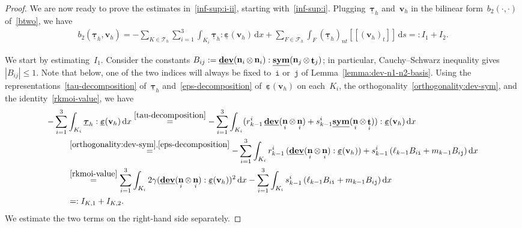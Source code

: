 \documentclass[10pt,a4paper]{amsart}
\newcommand{\F}{F}
\newcommand{\Fcalh}{\mathcal{F}_h}
\newcommand{\IKone}{I_{\K,1}}
\newcommand{\IKtwo}{I_{\K,2}}
\newcommand{\Ione}{I_1}
\newcommand{\Itwo}{I_2}
\newcommand{\K}{K}
\newcommand{\Ki}{{\K_i}}
\newcommand{\Tauh}{\mathcal{T}_h}
\newcommand{\btwo}{b_2}
\DeclareMathOperator{\dev}{\underline{\mathbf{dev}}}
\newcommand{\ds}{\, \mathrm{d}s}
\newcommand{\dx}{\, \mathrm{d}x}
\newcommand{\epsbfun}{\underline{\boldsymbol{\varepsilon}}}
\newcommand{\itt}{\mathtt{i}}
\newcommand{\jtt}{\mathtt{j}}
\newcommand{\jump}[1]{\left[\!\left[#1\right]\!\right]}
\newcommand{\lkmo}{\ell_{k-1}}
\newcommand{\mkmo}{m_{k-1}}
\DeclareMathOperator{\norm}{\bf{n}}
\newcommand{\normi}{\norm_i}
\newcommand{\normj}{\norm_j}
\newcommand{\normtang}{{nt}}
\newcommand{\rkmoi}{r_{k-1}^i}
\newcommand{\skmoi}{s_{k-1}^i}
\newcommand{\sym}{\underline{\bf{sym}}}
\DeclareMathOperator{\tang}{\bf{t}}
\newcommand{\tangi}{\tang_i}
\newcommand{\tangj}{\tang_j}
\newcommand{\tangscalar}{t}
\newcommand{\taubfh}{\underline{\boldsymbol{\tau}}_h}
\newcommand{\vbfh}{\mathbf{v}_h}
\begin{document}
\begin{proof}
We are now ready to prove the estimates in~\eqref{inf-sup:i-ii},
starting with~\eqref{inf-sup:i}.
Plugging~$\taubfh$ and~$\vbfh$
in the bilinear form~$\btwo(\cdot,\cdot)$ of~\eqref{btwo},
we have
\begin{equation*} \label{bt-Ione-Itwo}
\begin{split}
\btwo(\taubfh,\vbfh) 
= -\sum_{\K \in \Tauh} \sum_{i=1}^3 \int_{\Ki} \taubfh : \epsbfun(\vbfh) \dx
    + \sum_{\F \in \Fcalh} \int_{\F} (\taubfh)_{\normtang}\jump{(\vbfh)_{\tangscalar}} \ds 
=: \Ione + \Itwo.
\end{split}
\end{equation*}

We start by estimating~$\Ione$.
Consider the constants
$B_{ij} := \dev(\normi\otimes\normi):\sym(\normj\otimes\tangj)$;
in particular,
Cauchy--Schwarz inequality gives~$|B_{ij}| \leq 1$.
Note that below,
one of the two indices will always be fixed to~$\itt$ or~$\jtt$
of Lemma~\ref{lemma:dev-n1-n2-basis}.
Using the representations~\eqref{tau-decomposition} of~$\taubfh$
and~\eqref{eps-decomposition} of~$\epsbfun(\vbfh)$  on each~$\Ki$,
the orthogonality~\eqref{orthogonality:dev-sym},
and the identity~\eqref{rkmoi-value},
we have
\begin{equation} \label{Ione}
\begin{split}
-\sum_{i=1}^3& \int_{\Ki} \taubfh : \epsbfun(\vbfh) \dx 
\overset{\eqref{tau-decomposition}}{=}
-\sum_{i=1}^3 \int_{\Ki} (\rkmoi\dev(\normi\otimes\normi)+\skmoi\sym(\normi\otimes\tangi)) : \epsbfun(\vbfh) \dx \\
&\overset{\eqref{orthogonality:dev-sym},\eqref{eps-decomposition}}{=} 
-\sum_{i=1}^3 \int_{\Ki} 
   \rkmoi\,(\dev(\normi\otimes\normi):\epsbfun(\vbfh))
   + \skmoi\,(\lkmo B_{i\itt} + \mkmo B_{i\jtt}) \dx \\
&\overset{\eqref{rkmoi-value}}{=}
\sum_{i=1}^3 \int_{\Ki} 
   2\gamma(\dev(\normi\otimes\normi):\epsbfun(\vbfh))^2 
   \dx
   -\sum_{i=1}^3 \int_{\Ki} \skmoi\,(\lkmo B_{i\itt} + \mkmo B_{i\jtt}) \dx\\
&=: {\IKone} + {\IKtwo}.
\end{split}
\end{equation}
We estimate the two terms on the right-hand side separately.


\end{proof}
\end{document}
